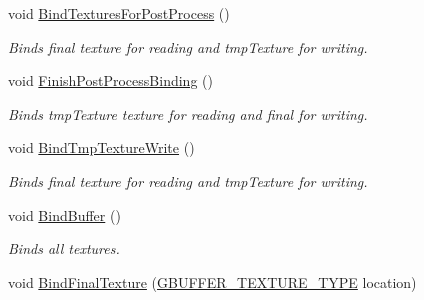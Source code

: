 \begin{DoxyCompactItemize}
void \mbox{\hyperlink{class_geometry_engine_1_1_geometry_buffer_1_1_g_buffer_a9c67280eb1c468c049674662bc81af5b}{Bind\+Textures\+For\+Post\+Process}} ()
\begin{DoxyCompactList}\small\item\em Binds final texture for reading and tmp\+Texture for writing. \end{DoxyCompactList}\item 
\mbox{\label{class_geometry_engine_1_1_geometry_buffer_1_1_g_buffer_aeb43b5511b3644649054af798775bd12}} 
void \mbox{\hyperlink{class_geometry_engine_1_1_geometry_buffer_1_1_g_buffer_aeb43b5511b3644649054af798775bd12}{Finish\+Post\+Process\+Binding}} ()
\begin{DoxyCompactList}\small\item\em Binds tmp\+Texture texture for reading and final for writing. \end{DoxyCompactList}\item 
\mbox{\label{class_geometry_engine_1_1_geometry_buffer_1_1_g_buffer_af6be0b4fb6077770c9e3a3673b1e5044}} 
void \mbox{\hyperlink{class_geometry_engine_1_1_geometry_buffer_1_1_g_buffer_af6be0b4fb6077770c9e3a3673b1e5044}{Bind\+Tmp\+Texture\+Write}} ()
\begin{DoxyCompactList}\small\item\em Binds final texture for reading and tmp\+Texture for writing. \end{DoxyCompactList}\item 
\mbox{\label{class_geometry_engine_1_1_geometry_buffer_1_1_g_buffer_a9bcec235e3592cec2c51563b3e8984c4}} 
void \mbox{\hyperlink{class_geometry_engine_1_1_geometry_buffer_1_1_g_buffer_a9bcec235e3592cec2c51563b3e8984c4}{Bind\+Buffer}} ()
\begin{DoxyCompactList}\small\item\em Binds all textures. \end{DoxyCompactList}\item 
void \mbox{\hyperlink{class_geometry_engine_1_1_geometry_buffer_1_1_g_buffer_ad64fb7191a7dc256b1282a7f1deab756}{Bind\+Final\+Texture}} (\mbox{\hyperlink{class_geometry_engine_1_1_geometry_buffer_1_1_g_buffer_a718dceafcac1915f7de061108597e1cc}{G\+B\+U\+F\+F\+E\+R\+\_\+\+T\+E\+X\+T\+U\+R\+E\+\_\+\+T\+Y\+PE}} location)

\end{DoxyCompactItemize}
